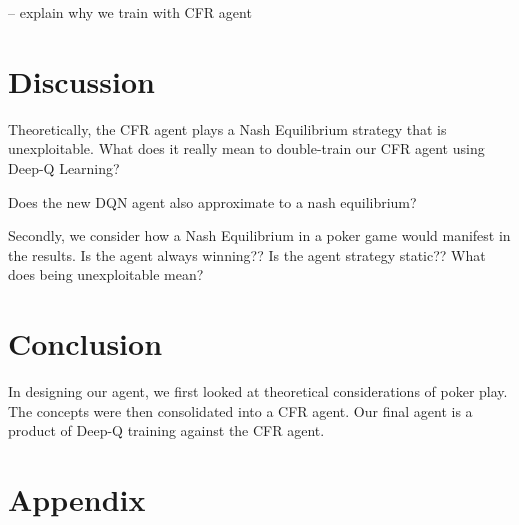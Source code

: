 \documentclass{article}
\begin{document}
-- explain why we train with CFR agent

\section{Discussion}
Theoretically, the CFR agent plays a Nash Equilibrium strategy that is unexploitable. What does it really mean to double-train our CFR agent using Deep-Q Learning?

 Does the new DQN agent also approximate to a nash equilibrium?

Secondly, we consider how a Nash Equilibrium in a poker game would manifest in the results. Is the agent always winning?? Is the agent strategy static?? What does being unexploitable mean?

\section{Conclusion}

In designing our agent, we first looked at theoretical considerations of poker play. The concepts were then consolidated into a CFR agent. Our final agent is a product of Deep-Q training against the CFR agent.



\iffalse
@article{ todd:cfr,
  author = "Todd W. Neller and Marc Lanctot"
  title = "An Introduction to Counterfactual Regret Minimization",
  month = "July",
  year = "2013"
}


@article{ yako:dqn,
	author = "Nikolai Yakovenko, Liangliang Cao, Colin Raffel and James Fan",
	title = "Poker-CNN: A Pattern Learning Strategy for Making Draws and Bets in Poker Games",
	journal = "Association for the Advancement of Artificial
Intelligence",
	month = "September",
	year = 2015
}

@article{ samz:tartarian,
	author = "Sam Ganzfried and Tuomas Sandholm",
	title = "Tartanian5: A Heads-Up No-Limit Texas Hold’em Poker-Playing Program",
	journal = "Association for the Advancement of Artificial
Intelligence",
	year = "2012"
}

@article{ michael:guide,
	author = "Michael Bradley Johanson",
	title = "Robust Strategies and Counter-Strategies: Building a Champion Level Computer Poker Player",
	journal = "University of Alberta Library"
	year = "2007"
}
\fi
\appendix
\section{Appendix}
\end{document}
